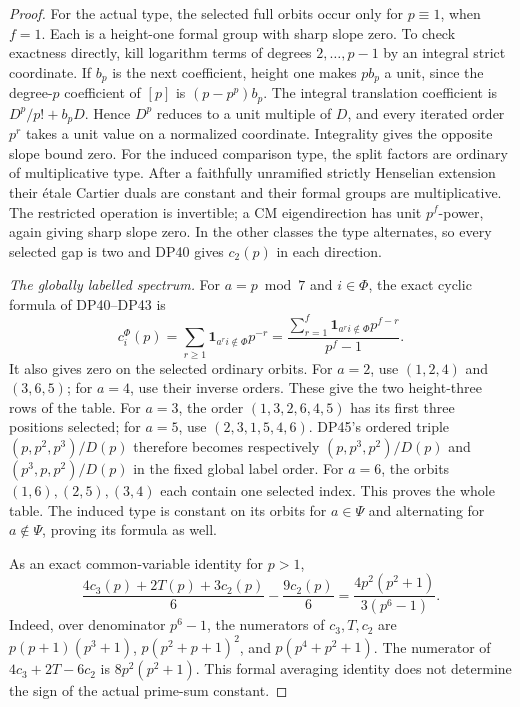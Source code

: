 \documentclass[11pt,a4paper]{article}
\theoremstyle{definition}\newtheorem{remark}[theorem]{Remark}
\begin{document}
\begin{proof}
For the actual type, the selected full orbits occur only for $p\equiv1$, when $f=1$. Each is a height-one formal group with sharp slope zero. To check exactness directly, kill logarithm terms of degrees $2,\ldots,p-1$ by an integral strict coordinate. If $b_p$ is the next coefficient, height one makes $pb_p$ a unit, since the degree-$p$ coefficient of $[p]$ is $(p-p^p)b_p$.
The integral translation coefficient is $D^p/p!+b_pD$.
Hence $D^p$ reduces to a unit multiple of $D$, and every iterated order $p^r$ takes a unit value on a normalized coordinate. Integrality gives the opposite slope bound zero.
For the induced comparison type, the split factors are ordinary of multiplicative type. After a faithfully unramified strictly Henselian extension their \'etale Cartier duals are constant and their formal groups are multiplicative. The restricted operation is invertible; a CM eigendirection has unit $p^f$-power, again giving sharp slope zero. In the other classes the type alternates, so every selected gap is two and DP40 gives $c_2(p)$ in each direction.

\emph{The globally labelled spectrum.}
For $a=p\bmod7$ and $i\in\Phi$, the exact cyclic formula of DP40--DP43 is
\begin{equation}\label{eq:cmprimecycle}
 c_i^\Phi(p)
 =\sum_{r\ge1}\mathbf1_{a^ri\notin\Phi}p^{-r}
 =\frac{\sum_{r=1}^f\mathbf1_{a^ri\notin\Phi}p^{f-r}}{p^f-1}.
\end{equation}
It also gives zero on the selected ordinary orbits.
For $a=2$, use $(1,2,4)$ and $(3,6,5)$; for $a=4$, use their inverse orders. These give the two height-three rows of the table.
For $a=3$, the order $(1,3,2,6,4,5)$ has its first three positions selected; for $a=5$, use $(2,3,1,5,4,6)$. DP45's ordered triple $(p,p^2,p^3)/D(p)$ therefore becomes respectively $(p,p^3,p^2)/D(p)$ and $(p^3,p,p^2)/D(p)$ in the fixed global label order.
For $a=6$, the orbits $(1,6),(2,5),(3,4)$ each contain one selected index. This proves the whole table. The induced type is constant on its orbits for $a\in\Psi$ and alternating for $a\notin\Psi$, proving its formula as well.

As an exact common-variable identity for $p>1$,
\begin{equation}\label{eq:cmprimeformalaverage}
 \frac{4c_3(p)+2T(p)+3c_2(p)}6-\frac{9c_2(p)}6
       =\frac{4p^2(p^2+1)}{3(p^6-1)}.
\end{equation}
Indeed, over denominator $p^6-1$, the numerators of $c_3,T,c_2$ are
$p(p+1)(p^3+1)$, $p(p^2+p+1)^2$, and $p(p^4+p^2+1)$.
The numerator of $4c_3+2T-6c_2$ is $8p^2(p^2+1)$.
This formal averaging identity does not determine the sign of the actual prime-sum constant.


\end{proof}
\end{document}
